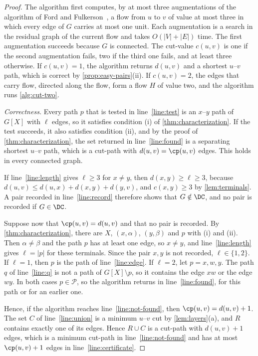 \begin{proof}
The algorithm first computes, by at most three augmentations of the algorithm of Ford and Fulkerson~\cite[Section~10.4]{Erickson2019Algorithms}, a flow from $u$ to $v$ of value at most three in which every edge of $G$ carries at most one unit.
Each augmentation is a search in the residual graph of the current flow and takes $O(|V| + |E|)$ time.
The first augmentation succeeds because $G$ is connected.
The cut-value $c(u, v)$ is one if the second augmentation fails, two if the third one fails, and at least three otherwise.
If $c(u, v) = 1$, the algorithm returns $d(u, v)$ and a shortest $u$--$v$ path, which is correct by \cref{prop:easy-pairs}(ii).
If $c(u, v) = 2$, the edges that carry flow, directed along the flow, form a flow $H$ of value two, and the algorithm runs \cref{alg:cut-two}.

\emph{Correctness.}
Every path $p$ that is tested in line~\ref{line:test} is an $x$--$y$ path of $G[X]$ with $\ell$ edges, so it satisfies condition (i) of \cref{thm:characterization}.
If the test succeeds, it also satisfies condition (ii), and by the proof of \cref{thm:characterization}, the set returned in line~\ref{line:found} is a separating shortest $u$--$v$ path, which is a cut-path with $d(u, v) = \cp(u, v)$ edges.
This holds in every connected graph.

If line~\ref{line:length} gives $\ell \geq 3$ for $x \neq y$, then $d(x, y) \geq \ell \geq 3$, because $d(u, v) \leq d(u, x) + d(x, y) + d(y, v)$, and $c(x, y) \geq 3$ by \cref{lem:terminals}.
A pair recorded in line~\ref{line:record} therefore shows that $G \notin \DC$, and no pair is recorded if $G \in \DC$.

Suppose now that $\cp(u, v) = d(u, v)$ and that no pair is recorded.
By \cref{thm:characterization}, there are $X$, $(x, \alpha)$, $(y, \beta)$ and $p$ with (i) and (ii).
Then $\alpha \neq \beta$ and the path $p$ has at least one edge, so $x \neq y$, and line~\ref{line:length} gives $\ell = |p|$ for these terminals.
Since the pair $x, y$ is not recorded, $\ell \in \{1, 2\}$.
If $\ell = 1$, then $p$ is the path of line~\ref{line:edge}.
If $\ell = 2$, let $p = x, w, y$.
The path $q$ of line~\ref{line:q} is not a path of $G[X] \setminus p$, so it contains the edge $xw$ or the edge $wy$.
In both cases $p \in \mathcal{P}$, so the algorithm returns in line~\ref{line:found}, for this path or for an earlier one.

Hence, if the algorithm reaches line~\ref{line:not-found}, then $\cp(u, v) = d(u, v) + 1$.
The set $C$ of line~\ref{line:union} is a minimum $u$--$v$ cut by \cref{lem:layers}(a), and $R$ contains exactly one of its edges.
Hence $R \cup C$ is a cut-path with $d(u, v) + 1$ edges, which is a minimum cut-path in line~\ref{line:not-found} and has at most $\cp(u, v) + 1$ edges in line~\ref{line:certificate}.


\end{proof}

